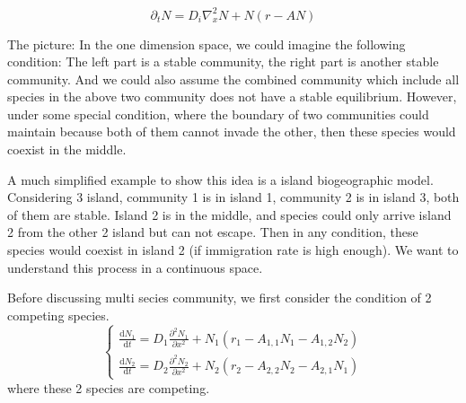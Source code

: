 \documentclass[12pt, a4paper]{article}
\begin{document}
\begin{equation*}
    \partial_t N = D_i \nabla^2_x N + N (r - AN)
\end{equation*}

The picture: In the one dimension space, we could imagine the following condition: The left part is a stable community, the right part is another stable community. And we could also assume the combined community which include all species in the above two community does not have a stable equilibrium. However, under some special condition, where the boundary of two communities could maintain because both of them cannot invade the other, then these species would coexist in the middle.

A much simplified example to show this idea is a island biogeographic model. Considering 3 island, community 1 is in island 1, community 2 is in island 3, both of them are stable. Island 2 is in the middle, and species could only arrive island 2 from the other 2 island but can not escape. Then in any condition, these species would coexist in island 2 (if immigration rate is high enough). We want to understand this process in a continuous space.

Before discussing multi secies community, we first consider the condition of 2 competing species.
\begin{equation}
    \begin{cases}
        \frac{\mathrm{d}N_1}{\mathrm{d}t}
    = D_{1}\frac{\partial^2 N_1}{\partial x^2} +
    N_1 \left( r_1 - A_{1,1} N_1 - A_{1,2} N_2 \right)\\
    \frac{\mathrm{d}N_2}{\mathrm{d}t}
    = D_{2}\frac{\partial^2 N_2}{\partial x^2} +
    N_2 \left( r_2 - A_{2,2} N_2 - A_{2,1} N_1 \right)
    \end{cases}
\end{equation}
where these 2 species are competing. 

\end{document}
